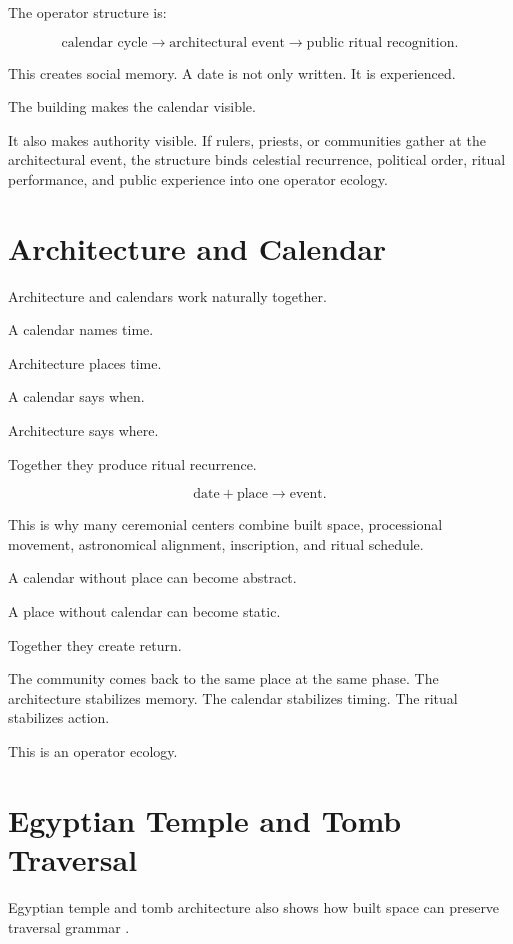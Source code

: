 \documentclass[11pt]{book}
\begin{document}
The operator structure is:

\[
\text{calendar cycle}
\rightarrow
\text{architectural event}
\rightarrow
\text{public ritual recognition}.
\]

This creates social memory. A date is not only written. It is experienced.

The building makes the calendar visible.

It also makes authority visible. If rulers, priests, or communities gather at the architectural event, the structure binds celestial recurrence, political order, ritual performance, and public experience into one operator ecology.

\section{Architecture and Calendar}

Architecture and calendars work naturally together.

A calendar names time.

Architecture places time.

A calendar says when.

Architecture says where.

Together they produce ritual recurrence.

\[
\text{date} + \text{place} \rightarrow \text{event}.
\]

This is why many ceremonial centers combine built space, processional movement, astronomical alignment, inscription, and ritual schedule.

A calendar without place can become abstract.

A place without calendar can become static.

Together they create return.

The community comes back to the same place at the same phase. The architecture stabilizes memory. The calendar stabilizes timing. The ritual stabilizes action.

This is an operator ecology.

\section{Egyptian Temple and Tomb Traversal}

Egyptian temple and tomb architecture also shows how built space can preserve traversal grammar \cite{Assmann2005DeathSalvation,Hornung1999BooksAfterlife,Hornung1990BookGates}.
\end{document}

